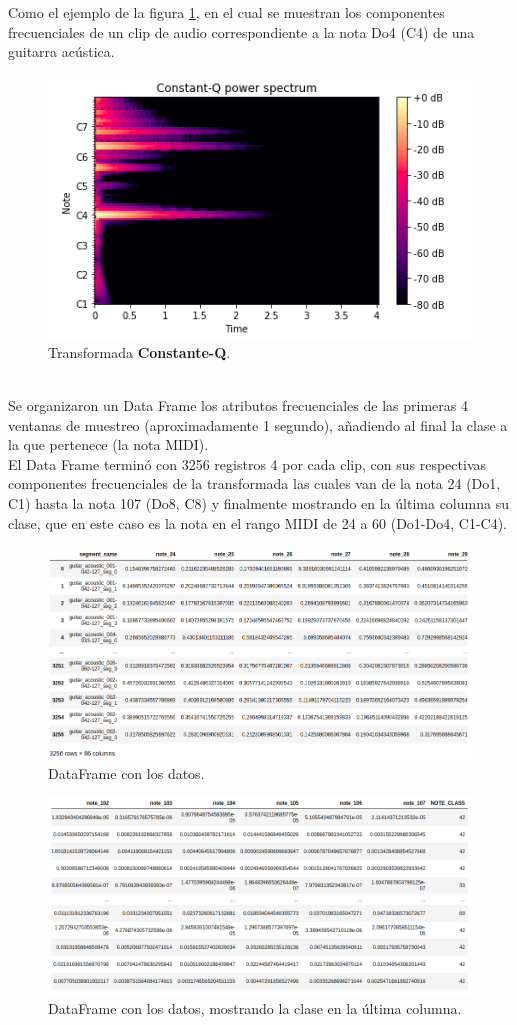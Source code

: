 \documentclass[12pt]{article}
\begin{document}
	Como el ejemplo de la figura \ref{fig1}, en el cual se muestran los componentes frecuenciales de un clip de audio correspondiente a la nota Do4 (C4) de una guitarra acústica.\\
	\begin{figure}[h!]
		\centering
		\includegraphics[width=.8\linewidth]{qtransform}
		\caption{Transformada \textbf{Constante-Q}.}
		\label{fig1}
	\end{figure}
\\
	Se organizaron un Data Frame los atributos frecuenciales de las primeras 4 ventanas de muestreo (aproximadamente 1 segundo), añadiendo al final la clase a la que pertenece (la nota MIDI).\\
	El Data Frame terminó con 3256 registros 4 por cada clip, con sus respectivas componentes frecuenciales de la transformada las cuales van de la nota 24 (Do1, C1) hasta la nota 107 (Do8, C8) y finalmente mostrando en la última columna su clase, que en este caso es la nota en el rango MIDI de 24 a 60 (Do1-Do4, C1-C4).
	
	\begin{figure}[h!]\label{fig2}
	\centering
	\includegraphics[width=.82\linewidth]{qtransfomtable_01}
	\caption{DataFrame con los datos.}
\end{figure}
	\begin{figure}[h!]\label{fig3}
	\centering
	\includegraphics[width=.82\linewidth]{qtransformtable_02}
	\caption{DataFrame con los datos, mostrando la clase en la última columna.}
\end{figure}
\clearpage
	
\end{document}

